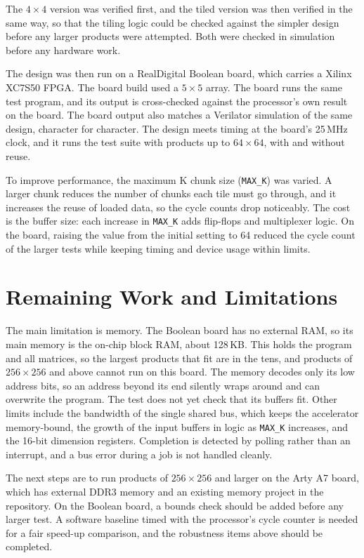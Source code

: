 \documentclass[10pt]{article}
\begin{document}
The $4\times4$ version was verified first, and the tiled version was then verified in the same
way, so that the tiling logic could be checked against the simpler design before any larger
products were attempted. Both were checked in simulation before any hardware work.

The design was then run on a RealDigital Boolean board, which carries a Xilinx XC7S50 FPGA. The
board build used a $5\times5$ array. The board runs the same test program, and its output is
cross-checked against the processor's own result on the board. The board output also matches a
Verilator simulation of the same design, character for character. The design meets timing at
the board's 25\,MHz clock, and it runs the test suite with products up to $64\times64$, with and
without reuse.

To improve performance, the maximum K chunk size (\texttt{MAX\_K}) was varied. A larger chunk
reduces the number of chunks each tile must go through, and it increases the reuse of loaded
data, so the cycle counts drop noticeably. The cost is the buffer size: each increase in
\texttt{MAX\_K} adds flip-flops and multiplexer logic. On the board, raising the value from the
initial setting to 64 reduced the cycle count of the larger tests while keeping timing and
device usage within limits.

\section*{Remaining Work and Limitations}
The main limitation is memory. The Boolean board has no external RAM, so its main memory is the
on-chip block RAM, about 128\,KB. This holds the program and all matrices, so the largest products
that fit are in the tens, and products of $256\times256$ and above cannot run on this board. The
memory decodes only its low address bits, so an address beyond its end silently wraps around and
can overwrite the program. The test does not yet check that its buffers fit. Other limits include
the bandwidth of the single shared bus, which keeps the accelerator memory-bound, the growth of
the input buffers in logic as \texttt{MAX\_K} increases, and the 16-bit dimension registers.
Completion is detected by polling rather than an interrupt, and a bus error during a job is not
handled cleanly.

The next steps are to run products of $256\times256$ and larger on the Arty A7 board, which has
external DDR3 memory and an existing memory project in the repository. On the Boolean board, a
bounds check should be added before any larger test. A software baseline timed with the
processor's cycle counter is needed for a fair speed-up comparison, and the robustness items
above should be completed.
\end{document}
